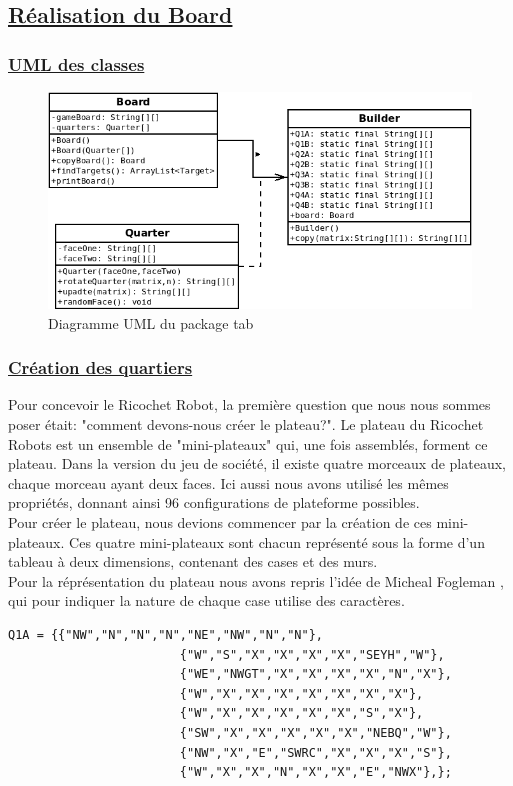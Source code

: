 \documentclass[12pt]{article}
\begin{document}
	\subsection{\underline{Réalisation du Board}}
	\subsubsection{\underline{UML des classes}}
	\begin{figure}[h!]
		\begin{center}
			\includegraphics[width=1\textwidth]{Images/tab.png}
		\end{center}
		\caption{Diagramme UML du package tab}
		\label{tabuml}
	\end{figure}

	\subsubsection{\underline{Création des quartiers}}
	Pour concevoir le Ricochet Robot, la première question que nous nous sommes poser était: "comment devons-nous créer le plateau?". 
	Le plateau du Ricochet Robots est un ensemble de "mini-plateaux" qui, une fois assemblés, forment ce plateau. Dans la version 
	du jeu de société, il existe quatre morceaux de plateaux, chaque morceau ayant deux faces. Ici aussi nous avons utilisé les 
	mêmes propriétés, donnant ainsi 96 configurations de plateforme possibles.
	\\
	Pour créer le plateau, nous devions commencer par la création de ces mini-plateaux. Ces quatre mini-plateaux sont chacun 
	représenté sous la forme d'un tableau à deux dimensions, contenant des cases et des murs.\\
	Pour la réprésentation du plateau nous avons repris l'idée de Micheal Fogleman \cite{MF}, qui pour indiquer la nature de chaque case utilise 
	des caractères.\\
	\begin{lstlisting}[tabsize=2,gobble=4]
		 Q1A = {{"NW","N","N","N","NE","NW","N","N"}, 
						{"W","S","X","X","X","X","SEYH","W"},
						{"WE","NWGT","X","X","X","X","N","X"}, 
						{"W","X","X","X","X","X","X","X"},
						{"W","X","X","X","X","X","S","X"}, 
						{"SW","X","X","X","X","X","NEBQ","W"},
						{"NW","X","E","SWRC","X","X","X","S"},
						{"W","X","X","N","X","X","E","NWX"},};	
	\end{lstlisting}
\end{document}
